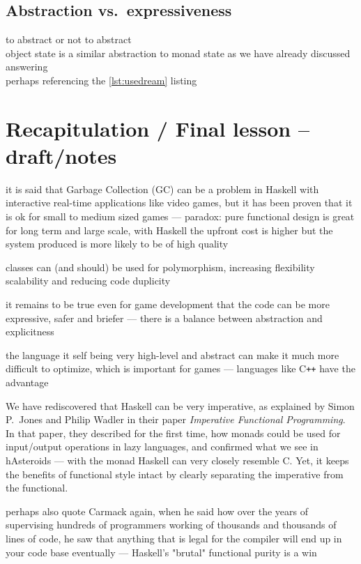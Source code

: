 \documentclass[
  digital, %
  color,   %
  table,   %
  oneside, %
  lof,     %
  lot,     %
]{fithesis3}
\newcommand{\cpp}{C\nolinebreak\texttt{+}\nolinebreak\texttt{+}}
\newcommand{\vs}{vs.\ }
\begin{document}
{\subsection{Abstraction \vs expressiveness}

to abstract or not to abstract\\
object state is a similar abstraction to monad state as we have already discussed\\
answering \\
perhaps referencing the \ref{lst:usedream} listing


\section{Recapitulation / Final lesson -- draft/notes}

it is said that Garbage Collection (GC) can be a problem in Haskell
with interactive real-time applications like video games, but it has been proven that
it is ok for small to medium sized games
--- paradox: pure functional design is great for long term and large scale,
with Haskell the upfront cost is higher but the system produced is more likely to be of high quality

classes can (and should) be used for polymorphism, increasing flexibility scalability and
reducing code duplicity

it remains to be true even for game development that the code can be more expressive,
safer and briefer --- there is a balance between abstraction and explicitness

the language it self being very high-level and abstract can make it much more
difficult to optimize, which is important for games --- languages like \cpp{} have the advantage

We have rediscovered that Haskell can be very imperative, as explained by Simon P.~Jones and
Philip Wadler in their paper \textit{Imperative Functional Programming}.\cite{imperativefp}
In that paper, they described for the first time, how monads could be used for input/output operations
in lazy languages, and confirmed what we see in hAsteroids ---  with the  monad
Haskell can very closely resemble C. Yet, it keeps the benefits of functional style intact by
clearly separating the imperative from the functional.

perhaps also quote Carmack again, when he said how over the years of supervising
hundreds of programmers working of thousands and thousands of lines of code, he saw that
anything that is legal for the compiler will end up in your code base eventually
--- Haskell's "brutal" functional purity is a win



}
\end{document}
